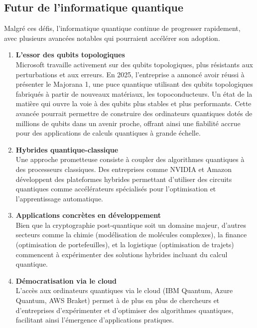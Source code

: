 \documentclass{article}
\begin{document}
\subsection{Futur de l'informatique quantique}

Malgré ces défis, l’informatique quantique continue de progresser rapidement, avec plusieurs avancées notables qui pourraient accélérer son adoption. 

\begin{enumerate}
  \item \textbf{L’essor des qubits topologiques} \\
  Microsoft travaille activement sur des qubits topologiques, plus résistants aux perturbations et aux erreurs. En 2025, l'entreprise a annoncé avoir réussi à présenter le Majorana 1, une puce quantique utilisant des qubits topologiques fabriqués à partir de nouveaux matériaux, les topoconducteurs. Un état de la matière qui ouvre la voie à des qubits plus stables et plus performants. Cette avancée pourrait permettre de construire des ordinateurs quantiques dotés de millions de qubits dans un avenir proche, offrant ainsi une fiabilité accrue pour des applications de calculs quantiques à grande échelle. \cite{microsoftMajorana}

  \item \textbf{Hybrides quantique-classique} \\
  Une approche prometteuse consiste à coupler des algorithmes quantiques à des processeurs classiques. Des entreprises comme NVIDIA et Amazon développent des plateformes hybrides permettant d’utiliser des circuits quantiques comme accélérateurs spécialisés pour l’optimisation et l’apprentissage automatique. 

  \item \textbf{Applications concrètes en développement} \\
  Bien que la cryptographie post-quantique soit un domaine majeur, d'autres secteurs comme la chimie (modélisation de molécules complexes), la finance (optimisation de portefeuilles), et la logistique (optimisation de trajets) commencent à expérimenter des solutions hybrides incluant du calcul quantique. 

  \item \textbf{Démocratisation via le cloud} \\
  L’accès aux ordinateurs quantiques via le cloud (IBM Quantum, Azure Quantum, AWS Braket) permet à de plus en plus de chercheurs et d'entreprises d’expérimenter et d’optimiser des algorithmes quantiques, facilitant ainsi l'émergence d'applications pratiques. 
\end{enumerate}
\end{document}

